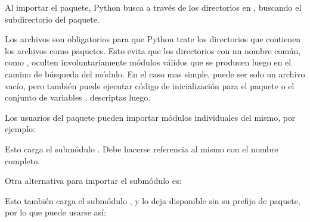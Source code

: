 \documentclass[a4,10pt,spanish]{sphinxmanual}
\begin{document}
\sphinxAtStartPar
Al importar el paquete, Python busca a través de los directorios en , buscando el sub\sphinxhyphen{}directorio del paquete.

\sphinxAtStartPar
Los archivos  son obligatorios para que Python trate los directorios que contienen los archivos como paquetes.  Esto evita que los directorios con un nombre común, como , oculten involuntariamente módulos válidos que se producen luego en el camino de búsqueda del módulo. En el caso mas simple,  puede ser solo un archivo vacío, pero también puede ejecutar código de inicialización para el paquete o el conjunto de variables , descriptas luego.

\sphinxAtStartPar
Los usuarios del paquete pueden importar módulos individuales del mismo, por ejemplo:

\begin{sphinxVerbatim}[commandchars=\\\{\}]
 
\end{sphinxVerbatim}

\sphinxAtStartPar
Esto carga el submódulo .  Debe hacerse referencia al mismo con el nombre completo.

\begin{sphinxVerbatim}[commandchars=\\\{\}]
   
\end{sphinxVerbatim}

\sphinxAtStartPar
Otra alternativa para importar el submódulo es:

\begin{sphinxVerbatim}[commandchars=\\\{\}]
   
\end{sphinxVerbatim}

\sphinxAtStartPar
Esto también carga el submódulo , y lo deja disponible sin su prefijo de paquete, por lo que puede usarse así:
\end{document}
